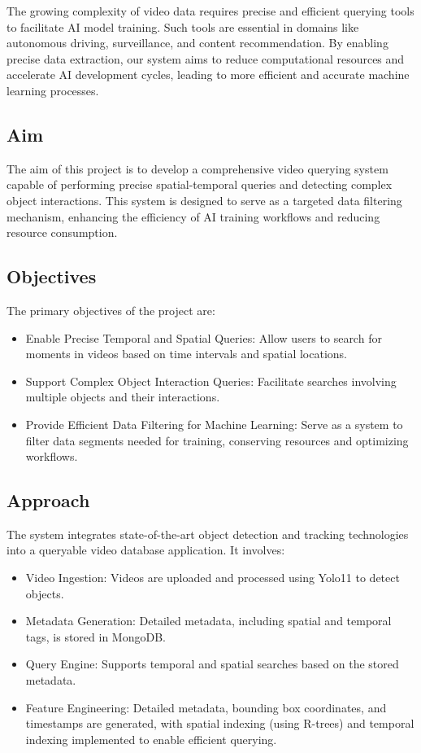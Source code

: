 \documentclass[conference]{IEEEtran}
\begin{document}
The growing complexity of video data requires precise and efficient querying tools to facilitate AI model training. Such tools are essential in domains like autonomous driving, surveillance, and content recommendation. By enabling precise data extraction, our system aims to reduce computational resources and accelerate AI development cycles, leading to more efficient and accurate machine learning processes.

\subsection{Aim}

The aim of this project is to develop a comprehensive video querying system capable of performing precise spatial-temporal queries and detecting complex object interactions. This system is designed to serve as a targeted data filtering mechanism, enhancing the efficiency of AI training workflows and reducing resource consumption.

\subsection{Objectives}

The primary objectives of the project are:

\begin{itemize}
    \item Enable Precise Temporal and Spatial Queries: Allow users to search for moments in videos based on time intervals and spatial locations.
    \item Support Complex Object Interaction Queries: Facilitate searches involving multiple objects and their interactions.
    \item Provide Efficient Data Filtering for Machine Learning: Serve as a system to filter data segments needed for training, conserving resources and optimizing workflows.
\end{itemize}
   
\subsection{Approach}

The system integrates state-of-the-art object detection and tracking technologies into a queryable video database application. It involves:

\begin{itemize}
    \item Video Ingestion: Videos are uploaded and processed using Yolo11\cite{yolo11} to detect objects.
    \item Metadata Generation: Detailed metadata, including spatial and temporal tags, is stored in MongoDB\cite{mongodb}.
    \item Query Engine: Supports temporal and spatial searches based on the stored metadata.
    \item Feature Engineering: Detailed metadata, bounding box coordinates, and timestamps are generated, with spatial indexing (using R-trees) and temporal indexing implemented to enable efficient querying.
\end{itemize}
\end{document}

